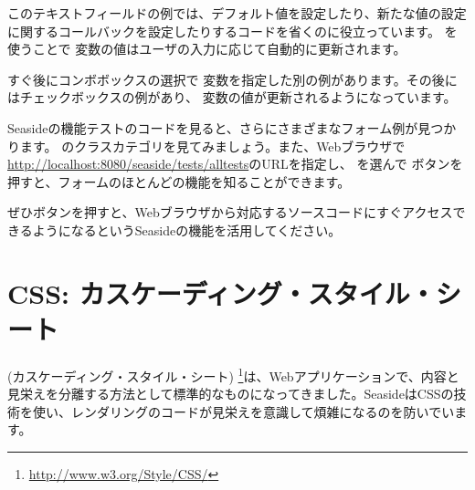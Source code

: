 \documentclass[a4paper,10pt,twoside]{book}
\begin{document}
このテキストフィールドの例では、デフォルト値を設定したり、新たな値の設定に関するコールバックを設定したりするコードを省くのに役立っています。 を使うことで  変数の値はユーザの入力に応じて自動的に更新されます。

すぐ後にコンボボックスの選択で 変数を指定した別の例があります。その後にはチェックボックスの例があり、  変数の値が更新されるようになっています。

Seasideの機能テストのコードを見ると、さらにさまざまなフォーム例が見つかります。
 のクラスカテゴリを見てみましょう。また、Webブラウザで\url{http://localhost:8080/seaside/tests/alltests}のURLを指定し、
 を選んで  ボタンを押すと、フォームのほとんどの機能を知ることができます。

ぜひボタンを押すと、Webブラウザから対応するソースコードにすぐアクセスできるようになるというSeasideの機能を活用してください。

\section{CSS: カスケーディング・スタイル・シート}


(カスケーディング・スタイル・シート) \footnote{\url{http://www.w3.org/Style/CSS/}}は、Webアプリケーションで、内容と見栄えを分離する方法として標準的なものになってきました。SeasideはCSSの技術を使い、レンダリングのコードが見栄えを意識して煩雑になるのを防いでいます。
\end{document}
